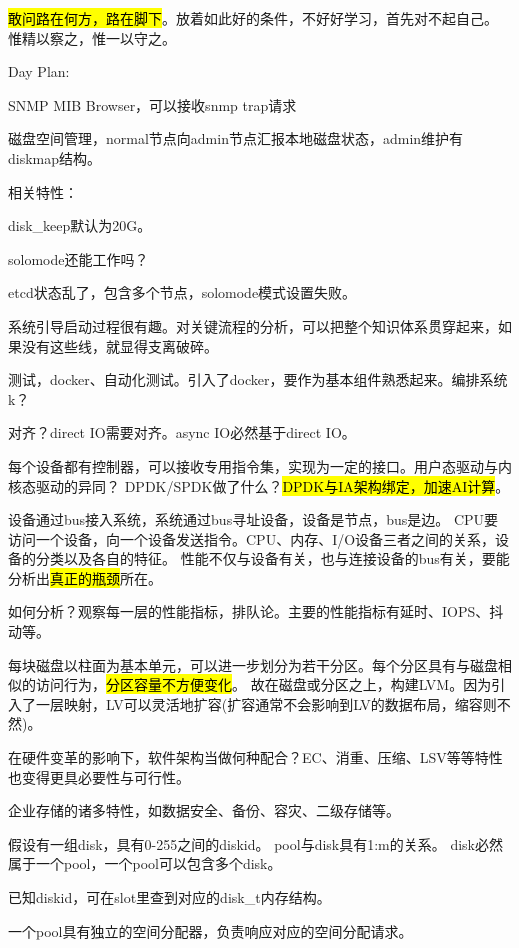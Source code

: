 \hl{敢问路在何方，路在脚下}。放着如此好的条件，不好好学习，首先对不起自己。
惟精以察之，惟一以守之。

Day Plan:
\begin{enumbox}
\item SNMP MIB Browser，可以接收snmp trap请求
\end{enumbox}

磁盘空间管理，normal节点向admin节点汇报本地磁盘状态，admin维护有diskmap结构。

相关特性：
\begin{enumbox}
\item disk\_keep默认为20G。
\item solomode还能工作吗？
\item etcd状态乱了，包含多个节点，solomode模式设置失败。
\end{enumbox}

系统引导启动过程很有趣。对关键流程的分析，可以把整个知识体系贯穿起来，如果没有这些线，就显得支离破碎。

测试，docker、自动化测试。引入了docker，要作为基本组件熟悉起来。编排系统k？

对齐？direct IO需要对齐。async IO必然基于direct IO。

每个设备都有控制器，可以接收专用指令集，实现为一定的接口。用户态驱动与内核态驱动的异同？
DPDK/SPDK做了什么？\hl{DPDK与IA架构绑定，加速AI计算}。

设备通过bus接入系统，系统通过bus寻址设备，设备是节点，bus是边。
CPU要访问一个设备，向一个设备发送指令。CPU、内存、I/O设备三者之间的关系，设备的分类以及各自的特征。
性能不仅与设备有关，也与连接设备的bus有关，要能分析出\hl{真正的瓶颈}所在。

如何分析？观察每一层的性能指标，排队论。主要的性能指标有延时、IOPS、抖动等。

每块磁盘以柱面为基本单元，可以进一步划分为若干分区。每个分区具有与磁盘相似的访问行为，\hl{分区容量不方便变化}。
故在磁盘或分区之上，构建LVM。因为引入了一层映射，LV可以灵活地扩容(扩容通常不会影响到LV的数据布局，缩容则不然)。

在硬件变革的影响下，软件架构当做何种配合？EC、消重、压缩、LSV等等特性也变得更具必要性与可行性。

企业存储的诸多特性，如数据安全、备份、容灾、二级存储等。

假设有一组disk，具有0-255之间的diskid。
pool与disk具有1:m的关系。
disk必然属于一个pool，一个pool可以包含多个disk。

已知diskid，可在slot里查到对应的disk\_t内存结构。

一个pool具有独立的空间分配器，负责响应对应的空间分配请求。


